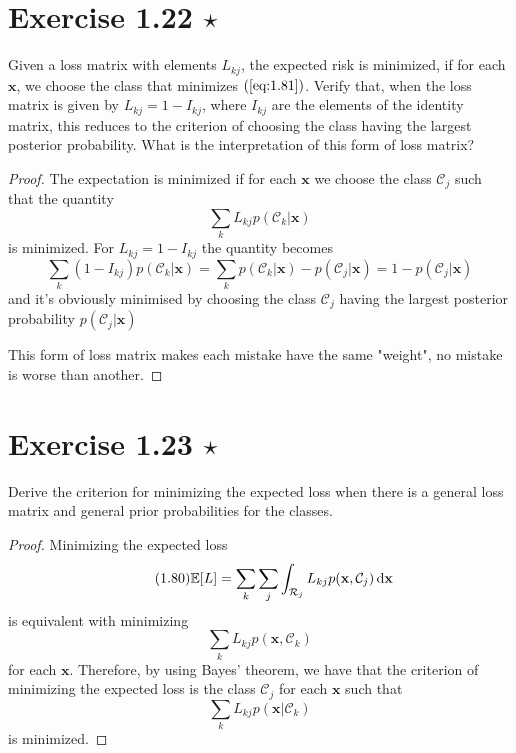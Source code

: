 \section*{Exercise 1.22 $\star$}
Given a loss matrix with elements $L_{kj}$, the expected risk
is minimized, if for each $\mathbf{x}$, we choose the class that minimizes
$(\ref{eq:1.81})$. Verify that, when the loss matrix is given by $L_{kj} = 1 - I_{kj}$,
where $I_{kj}$ are the elements of the identity matrix, this reduces to the criterion
of choosing the class having the largest posterior probability. What is the interpretation
of this form of loss matrix?

\vspace{1em}

\begin{proof}
    The expectation is minimized if for each $\mathbf{x}$ we choose the class $\mathcal{C}_j$ such
    that the quantity
    \begin{equation}\label{eq:1.81}\tag{1.81}
        \sum_k L_{kj} p(\mathcal{C}_k | \mathbf{x})
    \end{equation}
    is minimized. For $L_{kj} = 1 - I_{kj}$ the quantity becomes
    \[
        \sum_k (1 - I_{kj})p(\mathcal{C}_k | \mathbf{x}) 
        = \sum_k p(\mathcal{C}_k | \mathbf{x}) - p(\mathcal{C}_j | \mathbf{x}) 
        = 1 - p(\mathcal{C}_j | \mathbf{x})
    \] 
    and it's obviously minimised by choosing the class $\mathcal{C}_j$ having the largest 
    posterior probability $p(\mathcal{C}_j | \mathbf{x})$

    This form of loss matrix makes each mistake have the same "weight", no mistake
    is worse than another.
\end{proof}

\section*{Exercise 1.23 $\star$}
Derive the criterion for minimizing the expected loss when there
is a general loss matrix and general prior probabilities for the classes.

\vspace{1em}

\begin{proof}
    Minimizing the expected loss
    \begin{equation}\label{eq:1.80}\tag{1.80}
        \mathbb{E}[L] = \sum_k \sum_j \int_{\mathcal{R}_j} L_{kj} p(\mathbf{x}, \mathcal{C}_j) \mathop{}\!\mathrm{d} \mathbf{x}
    \end{equation}
    is equivalent with minimizing 
    \[
        \sum_k L_{kj} p(\mathbf{x}, \mathcal{C}_k)
    \] 
    for each $\mathbf{x}$. Therefore, by using Bayes' theorem, we have that
    the criterion of minimizing the expected loss is the class $\mathcal{C}_j$ for each
    $\mathbf{x}$ such that
    \[
        \sum_k L_{kj} p(\mathbf{x} | \mathcal{C}_k)
    \] 
    is minimized.
\end{proof}

